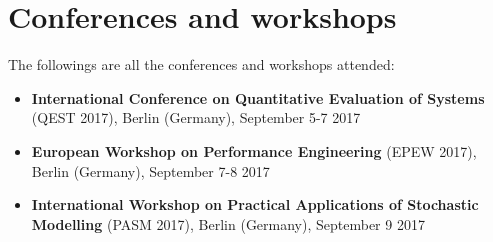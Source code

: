 
\section*{Conferences and workshops}

  The followings are all the conferences and workshops attended:
  
  \begin{itemize}
    \item \textbf{International Conference on Quantitative Evaluation of Systems} (\ac{QEST} 2017), Berlin (Germany), September 5-7 2017
    \item \textbf{European Workshop on Performance Engineering} (\ac{EPEW} 2017), Berlin (Germany), September 7-8 2017
    \item \textbf{International Workshop on Practical Applications of Stochastic Modelling} (\ac{PASM} 2017), Berlin (Germany), September 9 2017
  \end{itemize}

\newpage
